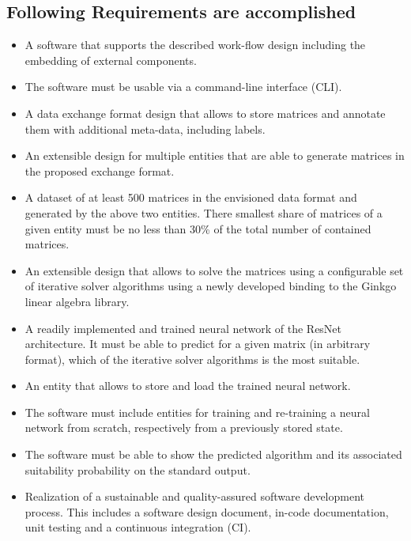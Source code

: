 \documentclass[parskip=full]{scrartcl}
\begin{document}
\subsection{Following Requirements are accomplished}
\begin{itemize}

\item A software that supports the described work-flow design including the embedding of external components.

\item The software must be usable via a \gls{command-line interface} (CLI).

\item A data exchange format design that allows to store matrices and annotate them with 
additional meta-data, including labels.

\item An extensible design for multiple entities that are able to generate matrices in the proposed exchange format.

\item A dataset of at least 500 matrices in the envisioned data format and generated by the above two entities. 
There smallest share of matrices of a given entity must be no less than 30\% of the total number of contained matrices.

\item An extensible design that allows to solve the matrices using a configurable set of \gls{iterative solver} algorithms using a newly developed binding to the \gls{Ginkgo} linear algebra library.

\item A readily implemented and trained \gls{neural network} of the \gls{ResNet} architecture. 
It must be able to predict for a given matrix (in arbitrary format), which of the \gls{iterative solver} algorithms is the most suitable.

\item An entity that allows to store and load the trained \gls{neural network}.

\item The software must include entities for training and re-training a \gls{neural network} from scratch, respectively from a previously stored state.

\item The software must be able to show the predicted \gls{algorithm} and its associated suitability probability on the standard output.

\item Realization of a sustainable and quality-assured software development process. 
This includes a software design document, in-code documentation, unit testing and a continuous integration (CI).

\end{itemize}
\end{document}
